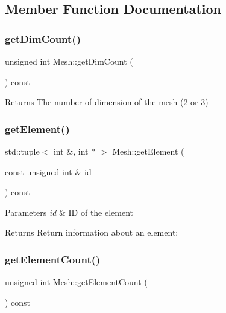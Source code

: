 \subsection{Member Function Documentation}
\mbox{\label{classMesh_aded45a45edb90ce60215df2f69fdedac}} 
\subsubsection{\texorpdfstring{get\+Dim\+Count()}{getDimCount()}}
{\footnotesize\ttfamily unsigned int Mesh\+::get\+Dim\+Count (\begin{DoxyParamCaption}{ }\end{DoxyParamCaption}) const}

\begin{DoxyReturn}{Returns}
The number of dimension of the mesh (2 or 3) 
\end{DoxyReturn}
\mbox{\label{classMesh_a415ffa23e4dcb0c73b60557455e87b25}} 
\subsubsection{\texorpdfstring{get\+Element()}{getElement()}}
{\footnotesize\ttfamily std\+::tuple$<$ int \&, int $\ast$ $>$ Mesh\+::get\+Element (\begin{DoxyParamCaption}\item[{const unsigned int \&}]{id }\end{DoxyParamCaption}) const}


\begin{DoxyParams}{Parameters}
{\em id} & ID of the element \\
\hline
\end{DoxyParams}
\begin{DoxyReturn}{Returns}
Return information about an element\+: 
\end{DoxyReturn}
\mbox{\label{classMesh_a9d0881d1942c4a0b8d08a4f440f1c3ea}} 
\subsubsection{\texorpdfstring{get\+Element\+Count()}{getElementCount()}}
{\footnotesize\ttfamily unsigned int Mesh\+::get\+Element\+Count (\begin{DoxyParamCaption}{ }\end{DoxyParamCaption}) const}


